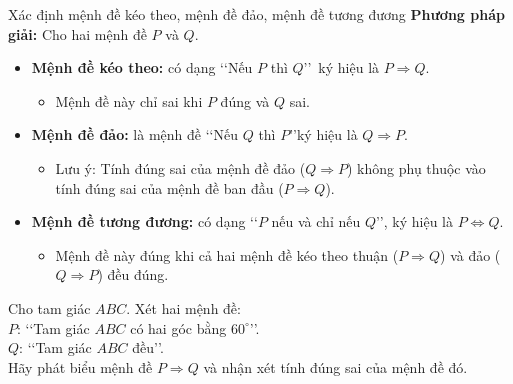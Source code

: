 \begin{dang}{Xác định mệnh đề kéo theo, mệnh đề đảo, mệnh đề tương đương}
	\textbf{Phương pháp giải:}
	Cho hai mệnh đề $P$ và $Q$.
	\begin{itemize}
		\item \textbf{Mệnh đề kéo theo:} có dạng \lq\lq Nếu $P$ thì $Q$\rq\rq\, ký hiệu là $P \Rightarrow Q$.
		\begin{itemize}
			\item Mệnh đề này chỉ sai khi $P$ đúng và $Q$ sai.
		\end{itemize}
		\item \textbf{Mệnh đề đảo:} là mệnh đề \lq\lq Nếu $Q$ thì $P$\rq\rq ký hiệu là $Q \Rightarrow P$.
		\begin{itemize}
			\item Lưu ý: Tính đúng sai của mệnh đề đảo ($Q \Rightarrow P$) không phụ thuộc vào tính đúng sai của mệnh đề ban đầu ($P \Rightarrow Q$).
		\end{itemize}
		\item \textbf{Mệnh đề tương đương:} có dạng \lq\lq $P$ nếu và chỉ nếu $Q$\rq\rq, ký hiệu là $P \Leftrightarrow Q$.
		\begin{itemize}
			\item Mệnh đề này đúng khi cả hai mệnh đề kéo theo thuận ($P \Rightarrow Q$) và đảo ($Q \Rightarrow P$) đều đúng.
		\end{itemize}
	\end{itemize}
\end{dang}
\setcounter{vd}{0}
\begin{vd}%
	Cho tam giác $ABC$. Xét hai mệnh đề:\\
	$P$: \lq \lq Tam giác $ABC$ có hai góc bằng $60^\circ$\rq \rq .\\
	$Q$: \lq \lq Tam giác $ABC$ đều\rq \rq. \\
	Hãy phát biểu mệnh đề $P \Rightarrow Q$ và nhận xét tính đúng sai của mệnh đề đó.\\
\end{vd}
